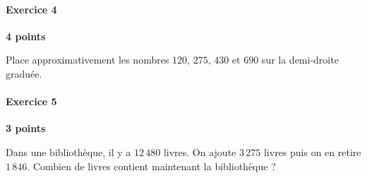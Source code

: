 \documentclass[a4paper,10pt]{report}
\begin{document}
\medskip\noindent\grandscarreaux{\linewidth}{2.4cm}

\medskip
\paragraph{Exercice 4} \hfill \textbf{4 points}

\noindent Place approximativement les nombres $120$, $275$, $430$ et $690$ sur la demi-droite graduée.

\begin{center}
\end{center}

\medskip
\paragraph{Exercice 5} \hfill \textbf{3 points}

\noindent Dans une bibliothèque, il y a $12\,480$ livres. On ajoute $3\,275$ livres puis on en retire $1\,846$. Combien de livres contient maintenant la bibliothèque ?

\medskip\noindent\grandscarreaux{\linewidth}{4cm}
\end{document}
